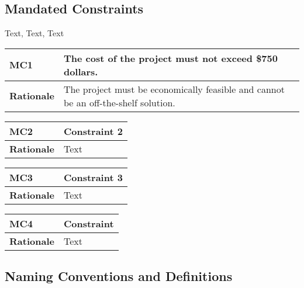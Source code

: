 \documentclass [11pt]{article}
\begin{document}
\subsection{Mandated Constraints}
Text, Text, Text

\begin{longtable}{| p{ } | p{ } | }\hline 
\rowcolor{tableCell}\textbf{MC1} & \textbf{The cost of the project must not exceed \$750 dollars.} \\ \hline
\textbf{Rationale} & The project must be economically feasible and cannot be an off-the-shelf solution.\\ \hline 
\end{longtable}

\begin{longtable}{| p{ } | p{ } | }\hline 
\rowcolor{tableCell}\textbf{MC2}& \textbf{Constraint 2}\\ \hline 
\textbf{Rationale} & Text\\ \hline 
\end{longtable}

\begin{longtable}{| p{ } | p{ } | }\hline 
\rowcolor{tableCell}\textbf{MC3} & \textbf{Constraint 3} \\ \hline
\textbf{Rationale} & Text\\ \hline
\end{longtable}

\begin{longtable}{| p{ } | p{ } | }\hline 
\rowcolor{tableCell}\textbf{MC4} & \textbf{Constraint} \\ \hline
\textbf{Rationale} & Text \\ \hline
\end{longtable}

\subsection{Naming Conventions and Definitions}

\end{document}
